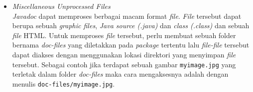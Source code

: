 \begin{itemize}
\begin{enumerate}
	\end{enumerate}
	Hasil dari dokumentasi {\it overview} terdapat pada gambar \ref{fig:c}.
	\begin{figure}[H]
	  \centering  
	  \texttt{[image: c]}
	  \caption[Hasil dokumentasi pada dari {\it overview}]{Hasil dokumentasi pada dari {\it overview}}
	  \label{fig:c} 
    \end{figure}
	\item {\it Miscellaneous Unprocessed Files}\\
	{\it Javadoc} dapat memproses berbagai macam format {\it file}. {\it File} tersebut dapat berupa sebuah {\it graphic files}, {\it Java source (.java)} dan {\it class (.class)} dan sebuah {\it file} HTML.
	Untuk memproses {\it file} tersebut, perlu membuat sebuah folder bernama {\it doc-files} yang diletakkan pada {\it package} tertentu lalu {\it file-file} tersebut dapat diakses dengan menggunakan lokasi direktori yang menyimpan {\it file} tersebut. Sebagai contoh jika terdapat sebuah gambar {\tt myimage.jpg} yang terletak dalam folder {\it doc-files} maka cara mengaksesnya adalah dengan menulis {\tt doc-files/myimage.jpg}.
\end{itemize}

